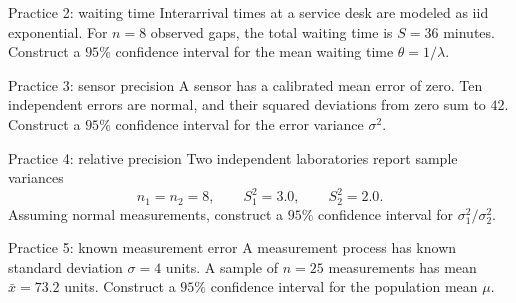 \documentclass[aspectratio=169,11pt]{beamer}
\begin{document}
\begin{frame}{Practice 2: waiting time}
  Interarrival times at a service desk are modeled as iid exponential. For $n=8$
  observed gaps, the total waiting time is $S=36$ minutes.
  Construct a $95\%$ confidence interval for the mean waiting time $\theta=1/\lambda$.

\end{frame}

\begin{frame}{Practice 3: sensor precision}
  A sensor has a calibrated mean error of zero. Ten independent errors are normal,
  and their squared deviations from zero sum to $42$.
  Construct a $95\%$ confidence interval for the error variance $\sigma^2$.

\end{frame}

\begin{frame}{Practice 4: relative precision}
  Two independent laboratories report sample variances
  \[
    n_1=n_2=8,\qquad S_1^2=3.0,\qquad S_2^2=2.0.
  \]
  Assuming normal measurements, construct a $95\%$ confidence interval for
  $\sigma_1^2/\sigma_2^2$.

\end{frame}

\begin{frame}{Practice 5: known measurement error}
  A measurement process has known standard deviation $\sigma=4$ units. A sample of
  $n=25$ measurements has mean $\bar x=73.2$ units.
  Construct a $95\%$ confidence interval for the population mean $\mu$.

\end{frame}
\end{document}

